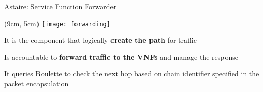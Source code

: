 \begin{frame}{Astaire: Service Function Forwarder}

  \begin{textblock*}{1cm}(9cm, 5cm)
    \texttt{[image: forwarding]}
  \end{textblock*}

  It is the component that logically \textbf{create the path} for traffic

  \vfill{}

  Is accountable to \textbf{forward traffic to the VNFs} and manage the response

  \vfill{}

  It queries Roulette to check the next hop based on chain identifier specified
  in the packet encapsulation

\end{frame}